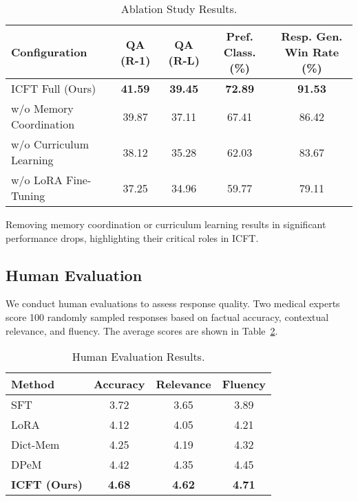 \begin{table}[ht]\small
\centering
\caption{Ablation Study Results.}
\label{tab:ablation}
\begin{tabular}{lcccc}
\toprule
\textbf{Configuration} & \textbf{QA (R-1)} & \textbf{QA (R-L)} & \textbf{Pref. Class. (\%)} & \textbf{Resp. Gen. Win Rate (\%)} \\
\midrule
ICFT Full (Ours)          & \textbf{41.59} & \textbf{39.45} & \textbf{72.89} & \textbf{91.53} \\
w/o Memory Coordination   & 39.87          & 37.11          & 67.41          & 86.42          \\
w/o Curriculum Learning   & 38.12          & 35.28          & 62.03          & 83.67          \\
w/o LoRA Fine-Tuning      & 37.25          & 34.96          & 59.77          & 79.11          \\
\bottomrule
\end{tabular}
\end{table}

Removing memory coordination or curriculum learning results in significant performance drops, highlighting their critical roles in ICFT.

\subsection{Human Evaluation}

We conduct human evaluations to assess response quality. Two medical experts score 100 randomly sampled responses based on factual accuracy, contextual relevance, and fluency. The average scores are shown in Table~\ref{tab:human_eval}.

\begin{table}[ht]
\centering
\caption{Human Evaluation Results.}
\label{tab:human_eval}
\begin{tabular}{lccc}
\toprule
\textbf{Method} & \textbf{Accuracy} & \textbf{Relevance} & \textbf{Fluency} \\
\midrule
SFT               & 3.72 & 3.65 & 3.89 \\
LoRA              & 4.12 & 4.05 & 4.21 \\
Dict-Mem          & 4.25 & 4.19 & 4.32 \\
DPeM              & 4.42 & 4.35 & 4.45 \\
\textbf{ICFT (Ours)} & \textbf{4.68} & \textbf{4.62} & \textbf{4.71} \\
\bottomrule
\end{tabular}
\end{table}

